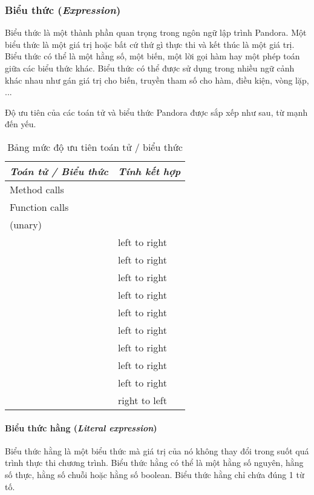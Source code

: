 \subsubsection{Biểu thức (\textit{Expression})}

\regexexpr

Biểu thức là một thành phần quan trọng trong ngôn ngữ lập trình Pandora. Một biểu thức là một giá trị hoặc bất cứ thứ gì thực thi và kết thúc là một giá trị. Biểu thức có thể là một hằng số, một biến, một lời gọi hàm hay một phép toán giữa các biểu thức khác. Biểu thức có thể được sử dụng trong nhiều ngữ cảnh khác nhau như gán giá trị cho biến, truyền tham số cho hàm, điều kiện, vòng lặp, ...

Độ ưu tiên của các toán tử và biểu thức Pandora được sắp xếp như sau, từ mạnh đến yếu. 

\begin{longtable}{| l | l |}
    \caption{Bảng mức độ ưu tiên toán tử / biểu thức} \\
\hline
\textbf{\textit{Toán tử / Biểu thức}} & \textbf{\textit{Tính kết hợp}} \\
\hline
Method calls & \\
\hline
Function calls & \\
\hline
\w{$-$}(unary) \w{$*$} \w{$!$} & \\
\hline
\w{$*$} \w{$/$} \w{$\%$} & left to right \\
\hline
\w{$+$} \w{$-$} & left to right \\
\hline
\w{$<<$} \w{$>>$} & left to right \\
\hline
\w{$\&$} & left to right \\
\hline
\w{$\wedge$} & left to right \\
\hline
\w{$|$} & left to right \\
\hline
\w{$==$} \w{$!=$} \w{$<$} \w{$>$} \w{$<=$} \w{$>=$} & left to right \\
\hline
\w{$\&\&$} & left to right \\
\hline
\w{$||$} & left to right \\
\hline
\w{$=$} \w{$+=$} \w{$-=$} \w{$*=$} \w{$/=$} \w{$\%=$} \w{$<<=$} \w{$>>=$} \w{$\&=$} \w{$\wedge=$} \w{$|=$} & right to left \\
\hline
\end{longtable}

\paragraph{Biểu thức hằng (\textit{Literal expression})}

\regexlitexpr

Biểu thức hằng là một biểu thức mà giá trị của nó không thay đổi trong suốt quá trình thực thi chương trình. Biểu thức hằng có thể là một hằng số nguyên, hằng số thực, hằng số chuỗi hoặc hằng số boolean. Biểu thức hằng chỉ chứa đúng 1 từ tố.
